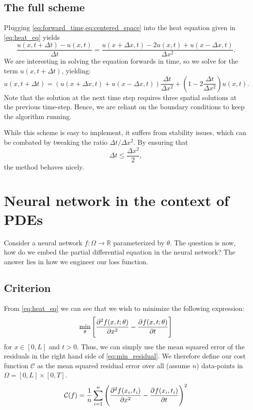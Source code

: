 \documentclass[article, a4paper, oneside]{memoir}
\newcommand{\cost}{\mathcal{C}}
\begin{document}
	\subsection{The full scheme}	

	Plugging \cref{eq:forward_time,eq:centered_space} into the heat
	equation given in \cref{eq:heat_eq} yields
	\begin{equation}
		\frac{u(x, t + \Delta t) - u(x, t)}{\Delta t} = \frac{u(x +
		\Delta x, t) - 2u(x, t) + u(x - \Delta x, t)}{\Delta x^2}.
	\end{equation}
	We are interesting in solving the equation forwards in time, so we
	solve for the term \( u(x, t + \Delta t) \), yielding:
	\begin{equation}
		u(x, t + \Delta t) = \left( u(x + \Delta x, t) + u(x - \Delta x, t) \right) \frac{\Delta t}{\Delta x^2} + \left(1 - 2 \frac{\Delta t}{\Delta x^2}\right)u(x, t).
	\end{equation}
	Note that the solution at the next time step requires three spatial
	solutions at the previous time-step. Hence, we are reliant on the
	boundary conditions to keep the algorithm running.

	While this scheme is easy to implement, it suffers from stability
	issues, which can be combated by tweaking the ratio \( \Delta t /
	\Delta x^2\). By ensuring that 
	\begin{equation}
		\Delta t \leq \frac{\Delta x^2}{2}, 
	\end{equation}
	the method behaves nicely.

	\section{Neural network in the context of PDEs}
	
	Consider a neural network \( f:\Omega \to \mathbb{R}\) parameterized by \(\theta\).  The
	question is now, how do we embed the partial differential equation in
	the neural network? The answer lies in how we engineer our loss
	function. 
	
	\subsection{Criterion}	

	From \cref{eq:heat_eq} we can see that we wish to minimize
	the following expression:
	\begin{equation}
		\label{eq:min_residual}
		\min_{\theta} \left[\dpd[2]{f(x, t; \theta)}{x} - \dpd{f(x, t; \theta)}{t}\right]
	\end{equation}
	for \( x \in [0, L] \) and \( t > 0\). Thus, we can simply use the mean
	squared error of the residuals in the right hand side of
	\cref{eq:min_residual}. We therefore define our cost function \( \cost
	\) as the mean squared residual error over all (assume \( n \))
	data-points  in \(\Omega = [0, L] \times [0, T]\).
	\begin{equation}
		\cost(f) = \frac{1}{n} \sum_{i=1}^n \left(  \dpd[2]{f(x_i, t_i)}{x}
		- \dpd{f(x_i, t_i)}{t}\right)^2
	\end{equation}
	
\end{document}
